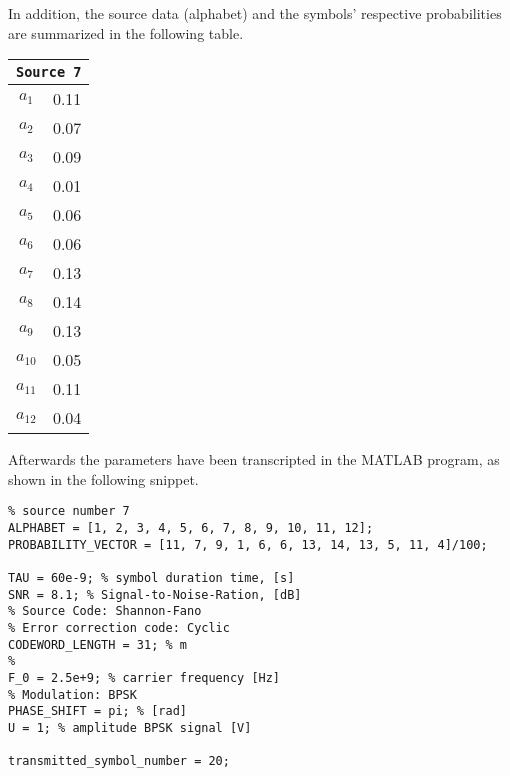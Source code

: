 \noindent In addition, the source data (alphabet) and the symbols' respective probabilities are summarized in the following table.

\begin{table}[h!]
    \centering
    \begin{tabular}{|c|c|}
        \hline
        \multicolumn{2}{|c|}{\texttt{Source 7}} \\\hline\hline
        $ a_1 $ & 0.11 \\
        $ a_2 $ & 0.07 \\
        $ a_3 $ & 0.09 \\
        $ a_4 $ & 0.01 \\
        $ a_5 $ & 0.06 \\
        $ a_6 $ & 0.06 \\
        $ a_7 $ & 0.13 \\
        $ a_8 $ & 0.14 \\
        $ a_9 $ & 0.13 \\
        $ a_{10} $ & 0.05 \\
        $ a_{11} $ & 0.11 \\
        $ a_{12} $ & 0.04 \\\hline
    \end{tabular}
    \label{tab:source7}
\end{table}

\noindent Afterwards the parameters have been transcripted in the MATLAB program, as shown in the following snippet. 

\begin{lstlisting}
% source number 7
ALPHABET = [1, 2, 3, 4, 5, 6, 7, 8, 9, 10, 11, 12];
PROBABILITY_VECTOR = [11, 7, 9, 1, 6, 6, 13, 14, 13, 5, 11, 4]/100;

TAU = 60e-9; % symbol duration time, [s]
SNR = 8.1; % Signal-to-Noise-Ration, [dB]
% Source Code: Shannon-Fano
% Error correction code: Cyclic
CODEWORD_LENGTH = 31; % m
% 
F_0 = 2.5e+9; % carrier frequency [Hz]
% Modulation: BPSK
PHASE_SHIFT = pi; % [rad]
U = 1; % amplitude BPSK signal [V]

transmitted_symbol_number = 20;
\end{lstlisting}





\setcounter{secnumdepth}{1}

